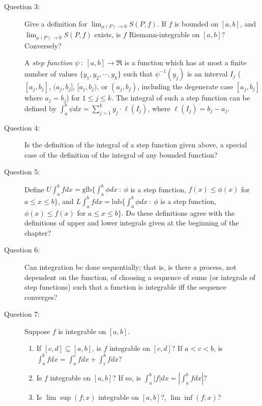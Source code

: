 \documentclass{article}
\begin{document}
\begin{description}
  \item[Question 3:] Give a definition for $\displaystyle \lim_{\mu(P) \to 0} S(P,f)$. If $f$ is bounded on $[a,b]$, and $\displaystyle \lim_{\mu(P) \to 0} S(P,f)$ exists, is $f$ Riemann-integrable on $[a,b]$? Conversely?

  \item[] A \emph{step function} $\psi\ :\ [a,b] \to \Re$ is a function which has at most a finite number of values $\{ y_1, y_2, \cdots, y_k \}$ such that $\psi^{-1}(y_j)$ is an interval $I_j$ ($[a_j,b_j]$, $(a_j,b_j]$, $[a_j,b_j)$, or $(a_j,b_j)$, including the degenerate case $[a_j,b_j]$ where $a_j = b_j$) for $1 \leq j \leq k$. The integral of such a step function can be defined by $\displaystyle \int_a^b \psi dx = \sum_{j=1}^k y_j \cdot \ell(I_j)$, where $\ell(I_j) = b_j - a_j$.

  \item[Question 4:] Is the definition of the integral of a step function given above, a special case of the definition of the integral of any bounded function?

  \item[Question 5:] Define $U \int_a^b f dx = \text{glb} \{ \int_a^b \phi dx\ :\ \phi$ is a step function, $f(x) \leq \phi(x)$ for $a \leq x \leq b \}$, and $L \int_a^b f dx = \text{lub} \{ \int_a^b \phi dx\ :\ \phi$ is a step function, $\phi(x) \leq f(x)$ for $a \leq x \leq b \}$. Do these definitions agree with the definitions of upper and lower integrals given at the beginning of the chapter?

  \item[Question 6:] Can integration be done sequentially; that is, is there a process, not dependent on the function, of choosing a sequence of sums (or integrals of step functions) such that a function is integrable iff the sequence converges?

  \item[Question 7:] Suppose $f$ is integrable on $[a,b]$.
    \begin{enumerate}[\hspace{1cm}(1)]
      \item If $[c,d] \subseteq [a,b]$, is $f$ integrable on $[c,d]$? If $a < c < b$, is $\int_a^b f dx = \int_a^c f dx + \int_c^b f dx$?
      \item Is $f$ integrable on $[a,b]$? If so, is $\int_a^b |f| dx = \left| \int_a^b f dx \right|$?
      \item Is $\lim \sup (f;x)$ integrable on $[a,b]$?, $\lim \inf (f;x)$?
    \end{enumerate}


\end{description}
\end{document}
